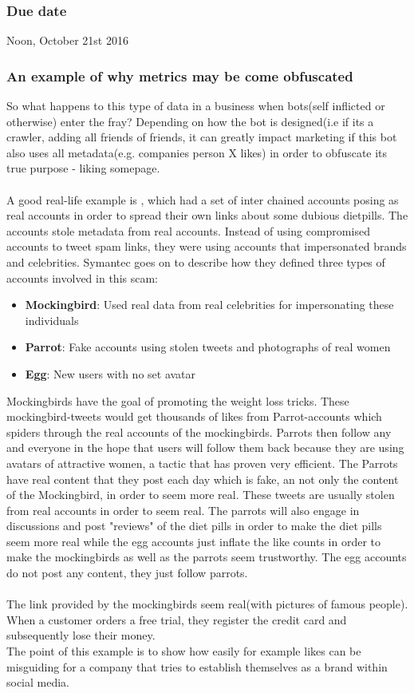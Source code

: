 \documentclass[12pt,a4paper]{article}
\begin{document}
\subsubsection*{Due date}
Noon, October 21st 2016

\subsubsection*{An example of why metrics may be come obfuscated }
So what happens to this type of data in a business when bots(self inflicted or otherwise) enter the fray? Depending on how the bot is designed(i.e if its a crawler, adding all friends of friends, it can greatly impact marketing if this bot also uses all metadata(e.g. companies person X likes) in order to obfuscate its true purpose - liking somepage. 
\\
\\
A good real-life example is \cite{Symantec:Narang}, which had a set of inter chained accounts posing as real accounts in order to spread their own links about some dubious dietpills. The accounts stole metadata from real accounts. Instead of using compromised
accounts to tweet spam links, they were using accounts that impersonated brands and
celebrities. Symantec goes on to describe how they defined three types of accounts involved in this scam:
\begin{itemize}
\item {\textbf{Mockingbird}: Used real data from real celebrities for impersonating these individuals}
\item{\textbf{Parrot}: Fake accounts using stolen tweets and photographs of real women}
\item{\textbf{Egg}: New users with no set avatar}
\end{itemize}
Mockingbirds have the goal of promoting the weight loss tricks. These mockingbird-tweets would get thousands of likes from Parrot-accounts which spiders through the real accounts of the mockingbirds. Parrots then follow any and everyone in the hope that users will follow them back because they are using avatars of attractive women, a tactic that has proven very efficient. The Parrots have real content that they post each day which is fake, an not only the content of the Mockingbird, in order to seem more real. These tweets are usually stolen from real accounts in order to seem real.  The parrots will also engage in discussions and post "reviews" of the diet pills in order to make the diet pills seem more real while the egg accounts just inflate the like counts in order to make the mockingbirds as well as the parrots seem trustworthy. The egg accounts do not post any content, they just follow parrots.
\\
\\ The link provided by the mockingbirds seem real(with pictures of famous people). When a customer orders a free trial, they register the credit card and subsequently lose their money. 
\\
The point of this example is to show how easily for example likes can be misguiding for a company that tries to establish themselves as a brand within social media.
\end{document}
